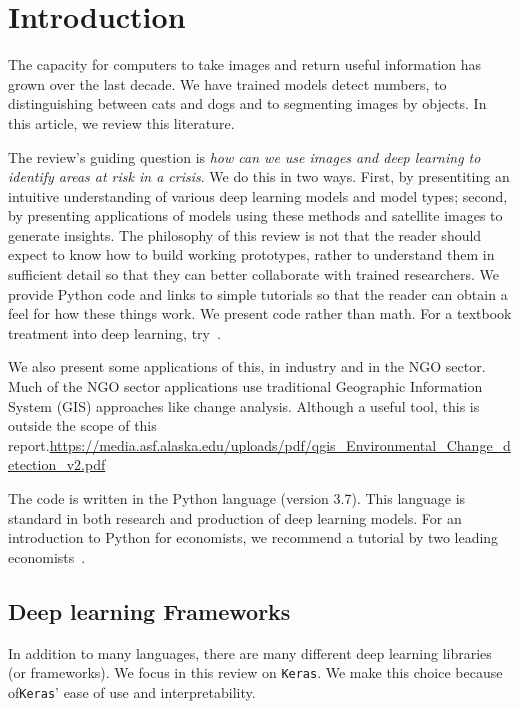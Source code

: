 \documentclass[12pt, a4paper, oneside, headinclude, footinclude]{article}
\begin{document}
\section{Introduction}

The capacity for computers to take images and return useful information has
grown over the last decade. We have trained models detect numbers, to
distinguishing between cats and dogs and to segmenting images by objects. In
this article, we review this literature.

The review's guiding question is \textit{how can we use
images and deep learning to identify areas at risk in a crisis}. We do this in
two ways. First, by presentiting an intuitive understanding of various deep
learning models and model types; second, by presenting applications of models
using these methods and satellite images to generate insights. The philosophy
of this review is not that the reader should expect to know how to build
working prototypes, rather to understand them in sufficient detail so that
they can better collaborate with trained researchers. We provide Python code and
links to simple tutorials so that the reader can obtain a feel for how these
things work. We present code rather than math. For a textbook treatment into
deep learning, try~\cite{lecun2015deep}.

We also present some applications of this, in industry and in the NGO sector.
Much of the NGO sector applications use traditional Geographic Information
System (GIS) approaches like change analysis. Although a useful tool, this is
outside the scope of this
report.\url{https://media.asf.alaska.edu/uploads/pdf/qgis_Environmental_Change_detection_v2.pdf}

The code is written in the Python language (version 3.7). This language is
standard in both research and production of deep learning models. For an
introduction to Python for economists, we recommend a tutorial by two leading
economists~\cite{EconomicsIntroduction}.


\subsection{Deep learning Frameworks}

In addition to many languages, there are many different deep learning
libraries (or frameworks). We focus in this review on \texttt{Keras}. We
make this choice because of\texttt{Keras}' ease of use and interpretability. 
\end{document}
